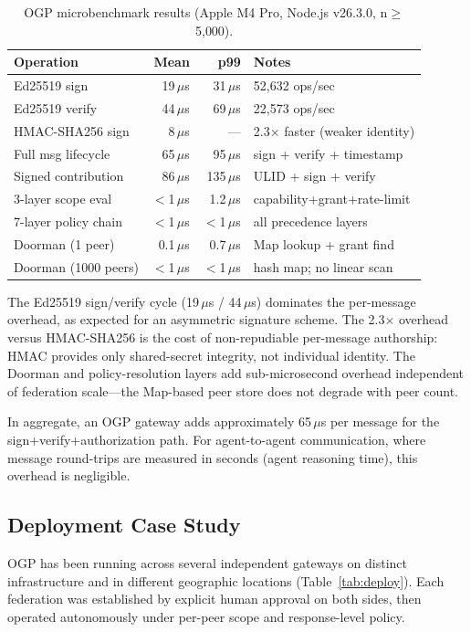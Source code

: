 \documentclass[sigconf,nonacm]{acmart}
\begin{document}
\begin{table}[h]
\centering
\caption{OGP microbenchmark results (Apple M4 Pro, Node.js v26.3.0, n$\geq$5{,}000).}
\label{tab:bench}
\small
\begin{tabular}{lrrl}
\toprule
Operation & Mean & p99 & Notes \\
\midrule
Ed25519 sign & 19\,$\mu$s & 31\,$\mu$s & 52{,}632 ops/sec \\
Ed25519 verify & 44\,$\mu$s & 69\,$\mu$s & 22{,}573 ops/sec \\
HMAC-SHA256 sign & 8\,$\mu$s & --- & 2.3$\times$ faster (weaker identity) \\
Full msg lifecycle & 65\,$\mu$s & 95\,$\mu$s & sign + verify + timestamp \\
Signed contribution & 86\,$\mu$s & 135\,$\mu$s & ULID + sign + verify \\
3-layer scope eval & $<$1\,$\mu$s & 1.2\,$\mu$s & capability+grant+rate-limit \\
7-layer policy chain & $<$1\,$\mu$s & $<$1\,$\mu$s & all precedence layers \\
Doorman (1 peer) & 0.1\,$\mu$s & 0.7\,$\mu$s & Map lookup + grant find \\
Doorman (1000 peers) & $<$1\,$\mu$s & $<$1\,$\mu$s & hash map; no linear scan \\
\bottomrule
\end{tabular}
\end{table}

The Ed25519 sign/verify cycle (19\,$\mu$s / 44\,$\mu$s) dominates the
per-message overhead, as expected for an asymmetric signature scheme.
The 2.3$\times$ overhead versus HMAC-SHA256 is the cost of non-repudiable
per-message authorship: HMAC provides only shared-secret integrity, not
individual identity. The Doorman and policy-resolution layers add
sub-microsecond overhead independent of federation scale---the Map-based
peer store does not degrade with peer count.

In aggregate, an OGP gateway adds approximately 65\,$\mu$s per message
for the sign+verify+authorization path. For agent-to-agent communication,
where message round-trips are measured in seconds (agent reasoning time),
this overhead is negligible.

\subsection{Deployment Case Study}

OGP has been running across several independent gateways on distinct
infrastructure and in different geographic locations
(Table~\ref{tab:deploy}). Each federation was established by explicit
human approval on both sides, then operated autonomously under per-peer
scope and response-level policy.
\end{document}
